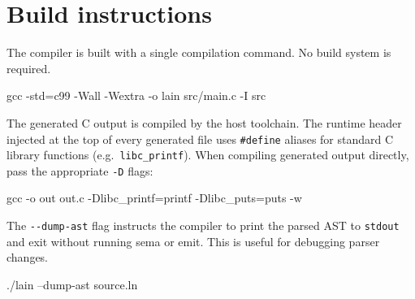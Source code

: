 \section{Build instructions}
\label{sec:arch-build}

\pnum
The compiler is built with a single compilation command.  No build system is
required.

\begin{ccode}
gcc -std=c99 -Wall -Wextra -o lain src/main.c -I src
\end{ccode}

\pnum
The generated C output is compiled by the host toolchain.  The runtime header
injected at the top of every generated file uses \texttt{\#define} aliases for
standard C library functions (e.g.\ \texttt{libc\_printf}).  When compiling
generated output directly, pass the appropriate \texttt{-D} flags:

\begin{ccode}
gcc -o out out.c -Dlibc_printf=printf -Dlibc_puts=puts -w
\end{ccode}

\pnum
The \texttt{-{}-dump-ast} flag instructs the compiler to print the parsed AST to
\texttt{stdout} and exit without running sema or emit.  This is useful for
debugging parser changes.

\begin{ccode}
./lain --dump-ast source.ln
\end{ccode}
